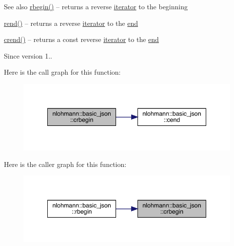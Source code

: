 \begin{DoxySeeAlso}{See also}
\mbox{\hyperlink{classnlohmann_1_1basic__json_a1ef93e2006dbe52667294f5ef38b0b10}{rbegin()}} -- returns a reverse \mbox{\hyperlink{classnlohmann_1_1basic__json_a099316232c76c034030a38faa6e34dca}{iterator}} to the beginning 

\mbox{\hyperlink{classnlohmann_1_1basic__json_ac77aed0925d447744676725ab0b6d535}{rend()}} -- returns a reverse \mbox{\hyperlink{classnlohmann_1_1basic__json_a099316232c76c034030a38faa6e34dca}{iterator}} to the \mbox{\hyperlink{classnlohmann_1_1basic__json_a13e032a02a7fd8a93fdddc2fcbc4763c}{end}} 

\mbox{\hyperlink{classnlohmann_1_1basic__json_a5795b029dbf28e0cb2c7a439ec5d0a88}{crend()}} -- returns a const reverse \mbox{\hyperlink{classnlohmann_1_1basic__json_a099316232c76c034030a38faa6e34dca}{iterator}} to the \mbox{\hyperlink{classnlohmann_1_1basic__json_a13e032a02a7fd8a93fdddc2fcbc4763c}{end}}
\end{DoxySeeAlso}
\begin{DoxySince}{Since}
version 1.. 
\end{DoxySince}
Here is the call graph for this function\+:\nopagebreak
\begin{figure}[H]
\begin{center}
\leavevmode
\includegraphics[width=341pt]{classnlohmann_1_1basic__json_a1e0769d22d54573f294da0e5c6abc9de_cgraph}
\end{center}
\end{figure}
Here is the caller graph for this function\+:\nopagebreak
\begin{figure}[H]
\begin{center}
\leavevmode
\includegraphics[width=341pt]{classnlohmann_1_1basic__json_a1e0769d22d54573f294da0e5c6abc9de_icgraph}
\end{center}
\end{figure}
